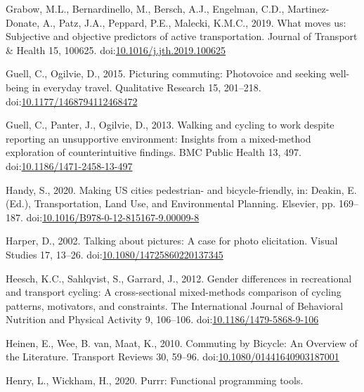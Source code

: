 \documentclass[]{elsarticle} %
\begin{document}
\leavevmode\hypertarget{ref-grabowWhatMovesUs2019a}{}%
Grabow, M.L., Bernardinello, M., Bersch, A.J., Engelman, C.D.,
Martinez-Donate, A., Patz, J.A., Peppard, P.E., Malecki, K.M.C., 2019.
What moves us: Subjective and objective predictors of active
transportation. Journal of Transport \& Health 15, 100625.
doi:\href{https://doi.org/10.1016/j.jth.2019.100625}{10.1016/j.jth.2019.100625}

\leavevmode\hypertarget{ref-guellPicturingCommutingPhotovoice2015}{}%
Guell, C., Ogilvie, D., 2015. Picturing commuting: Photovoice and
seeking well-being in everyday travel. Qualitative Research 15,
201--218.
doi:\href{https://doi.org/10.1177/1468794112468472}{10.1177/1468794112468472}

\leavevmode\hypertarget{ref-guellWalkingCyclingWork2013a}{}%
Guell, C., Panter, J., Ogilvie, D., 2013. Walking and cycling to work
despite reporting an unsupportive environment: Insights from a
mixed-method exploration of counterintuitive findings. BMC Public Health
13, 497.
doi:\href{https://doi.org/10.1186/1471-2458-13-497}{10.1186/1471-2458-13-497}

\leavevmode\hypertarget{ref-handyMakingUSCities2020}{}%
Handy, S., 2020. Making US cities pedestrian- and bicycle-friendly, in:
Deakin, E. (Ed.), Transportation, Land Use, and Environmental Planning.
Elsevier, pp. 169--187.
doi:\href{https://doi.org/10.1016/B978-0-12-815167-9.00009-8}{10.1016/B978-0-12-815167-9.00009-8}

\leavevmode\hypertarget{ref-harperTalkingPicturesCase2002}{}%
Harper, D., 2002. Talking about pictures: A case for photo elicitation.
Visual Studies 17, 13--26.
doi:\href{https://doi.org/10.1080/14725860220137345}{10.1080/14725860220137345}

\leavevmode\hypertarget{ref-heeschGenderDifferencesRecreational2012}{}%
Heesch, K.C., Sahlqvist, S., Garrard, J., 2012. Gender differences in
recreational and transport cycling: A cross-sectional mixed-methods
comparison of cycling patterns, motivators, and constraints. The
International Journal of Behavioral Nutrition and Physical Activity 9,
106--106.
doi:\href{https://doi.org/10.1186/1479-5868-9-106}{10.1186/1479-5868-9-106}

\leavevmode\hypertarget{ref-heinenCommutingBicycleOverview2010}{}%
Heinen, E., Wee, B. van, Maat, K., 2010. Commuting by Bicycle: An
Overview of the Literature. Transport Reviews 30, 59--96.
doi:\href{https://doi.org/10.1080/01441640903187001}{10.1080/01441640903187001}

\leavevmode\hypertarget{ref-R-purrr}{}%
Henry, L., Wickham, H., 2020. Purrr: Functional programming tools.
\end{document}
